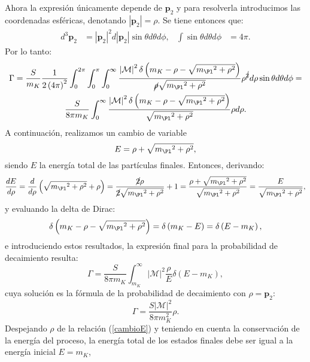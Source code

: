 Ahora la expresión únicamente depende de $\boldsymbol{p}_{2}$ y para resolverla introducimos las coordenadas esféricas, denotando $\left| \boldsymbol{p}_{2}\right|=\rho$. Se tiene entonces que:
\begin{align}
d^{3}\boldsymbol{p}_{2} &= \left| \boldsymbol{p}_{2}\right| ^{2}d\left|\boldsymbol{p}_{2}\right| \sin \theta d\theta d\phi , & \int \sin \theta d\theta d\phi &= 4\pi .
\end{align}
Por lo tanto:
\begin{multline}
\Gamma =\dfrac{S}{m_{K}}\dfrac{1}{2\left( 4\pi \right) ^{2}}\int ^{2\pi }_{0}\int ^{\pi }_{0}\int ^{\infty }_{0} \dfrac{\left|\mathcal{M}\right| ^{2}\delta\left(m_{K}-\rho-\sqrt{{m_{\Pl}}^{2}+\rho^{2}}\right)}{\cancel{\rho} \sqrt{{m_{\Pl}}^{2}+\rho^{2}}} \rho^{\cancel{2}}d{\rho}\sin \theta d\theta d\phi = \\ \dfrac{S}{8 \pi m_{K}}\int ^{\infty }_{0} \dfrac{\left|\mathcal{M}\right| ^{2}\delta\left(m_{K}-\rho-\sqrt{{m_{\Pl}}^{2}+\rho^{2}}\right)}{\sqrt{{m_{\Pl}}^{2}+\rho^{2}}} \rho d{\rho} .
\end{multline}
A continuación, realizamos un cambio de variable 
\begin{equation}
E=\rho+\sqrt{{m_{\Pl}}^{2}+\rho^{2}} ,\label{cambioE}
\end{equation}
siendo $E$ la energía total de las partículas finales. Entonces, derivando:
\begin{equation}
\dfrac{dE}{d\rho}=\dfrac{d}{d\rho}\left( \sqrt{{m_{\Pl}}^{2}+{\rho}^{2}}+\rho\right) =\dfrac{\cancel{2}\rho}{\cancel{2}\sqrt{{m_{\Pl}}^{2}+\rho^{2}}}+1=\dfrac{\rho + \sqrt{{m_{\Pl}}^{2}+\rho^{2}}}{\sqrt{{m_{\Pl}}^{2}+\rho^{2}}}=\dfrac{E}{\sqrt{{m_{\Pl}}^{2}+\rho^{2}}} ,
\end{equation}
y evaluando la delta de Dirac:
\begin{equation}
\delta \left(m_{K}-\rho-\sqrt{{m_{\Pl}}^{2}+\rho^{2}}\right)=\delta\left(m_{K}-E\right)=\delta\left(E-m_{K}\right),
\end{equation}
e introduciendo estos resultados, la expresión final para la probabilidad de decaimiento resulta:
\begin{equation}
\Gamma=\dfrac{S}{8 \pi m_{K}}\int ^{\infty }_{m_K}\left| \mathcal{M}\right| ^{2}\dfrac{\rho}{E}\delta \left(E-m_{K}\right) ,
\end{equation}
cuya solución es la fórmula de la probabilidad de decaimiento con $\rho=\boldsymbol{p}_2$:
\begin{equation}
\Gamma =\dfrac{S\left| \mathcal{M}\right| ^{2}}{8\pi m_{K}^{2}}\rho .\label{eq:decayratemalo}
\end{equation}
Despejando $\rho$ de la relación (\ref{cambioE}) y teniendo en cuenta la conservación de la energía del proceso, la energía total de los estados finales debe ser igual a la energía inicial $E=m_K$,

